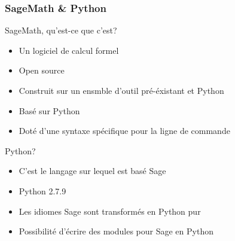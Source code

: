 \documentclass{beamer}
\begin{document}

\begin{frame}
\frametitle{SageMath \& Python}
\begin{center}
\begin{block}{SageMath, qu'est-ce que c'est?}
    \begin{itemize}
        \item Un logiciel de calcul formel
        \item Open source
        \item Construit sur un ensmble d'outil pré-éxistant et Python
        \item Basé sur Python
        \item Doté d'une syntaxe spécifique pour la ligne de commande
    \end{itemize}
\end{block}
\begin{block}{Python?}
    \begin{itemize}
        \item {\large C'est le langage sur lequel est basé Sage}
        \item Python 2.7.9
        \item Les idiomes Sage sont transformés en Python pur
        \item Possibilité d'écrire des modules pour Sage en Python
    \end{itemize}
\end{block}
\end{center}
\end{frame}

\end{document}
